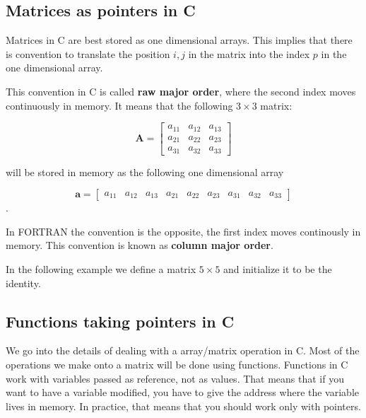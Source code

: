 \documentclass{article}
\begin{document}
\subsection{Matrices as pointers in C}
Matrices in C are best stored as one dimensional arrays. This implies that there is convention to translate the position $i,j$ in the matrix into the index $p$ in the one dimensional array. 

This convention in C is called {\bf raw major order}, where the second index moves continuously in memory. It means that the following $3\times 3$ matrix:


\begin{displaymath}
\mathbf{A} = 
\left[
\begin{array}{ccc}
a_{11}  & a_{12} & a_{13}   \\
a_{21}  & a_{22}   & a_{23}  \\
a_{31}  & a_{32} & a_{33}   
\end{array}
\right]
\end{displaymath}

will be stored in memory as the following one dimensional array

\begin{displaymath}
\mathbf{a} = 
\left[
\begin{array}{ccccccccc}
a_{11}  & a_{12} & a_{13}   & a_{21}  & a_{22}   & a_{23}  & a_{31}  & a_{32} & a_{33}   
\end{array}
\right]
\end{displaymath}.

In FORTRAN the convention is the opposite, the first index moves continously in memory. This convention is known as {\bf column major order}. 

In the following example we define a matrix $5\times 5$ and initialize it to be 
the identity.




\subsection{Functions taking pointers in C}
We go into the details of dealing with a array/matrix operation in C. Most of the operations we make onto a matrix will be done using functions. Functions in C work with variables passed as reference, not as values. That means that if you want to have a variable modified, you have to give the address where the variable lives in memory. In practice, that means that you should work only with pointers.
\end{document}
